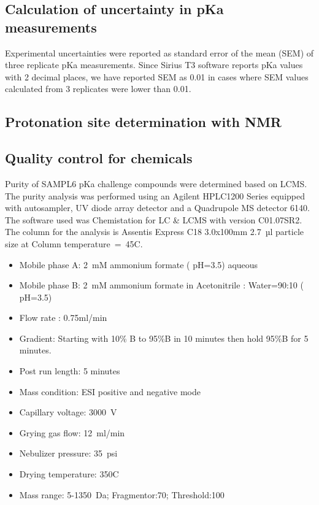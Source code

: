 \documentclass[9pt,lineno]{elife}
\begin{document}
\subsection{Calculation of uncertainty in pKa measurements}
Experimental uncertainties were reported as standard error of the mean (SEM) of three replicate pKa measurements. Since Sirius T3 software reports pKa values with 2 decimal places, we have reported SEM as 0.01 in cases where SEM values calculated from 3 replicates were lower than 0.01.


\subsection{Protonation site determination with NMR}

\subsection{Quality control for chemicals}
Purity of SAMPL6 pKa challenge compounds were determined based on LC\textendash MS. The purity analysis was performed using an Agilent HPLC1200 Series equipped with auto\textendash  sampler, UV diode array detector and a Quadrupole MS detector 6140. The software used was Chemistation for LC \& LC\/MS with version C01.07SR2.
The column for the analysis is Assentis Express C18 3.0x100mm 2.7~µl particle size at Column temperature~=~45\textdegree C.
\begin{itemize}

\item Mobile phase A: 2~mM ammonium formate ( pH=3.5) aqueous
\item Mobile phase B: 2~mM ammonium formate in Acetonitrile : Water=90:10 ( pH=3.5)
\item Flow rate : 0.75ml/min
\item Gradient: Starting with 10\% B to 95\%B in 10 minutes then hold 95\%B for 5 minutes. 
\item Post run length: 5 minutes 
\item Mass condition: ESI positive and negative mode
\item Capillary voltage: 3000~V
\item Grying gas flow: 12~ml/min
\item Nebulizer pressure: 35~psi
\item Drying temperature: 350\textdegree C
\item Mass range: 5-1350~Da; Fragmentor:70; Threshold:100
\end{itemize}
\end{document}
